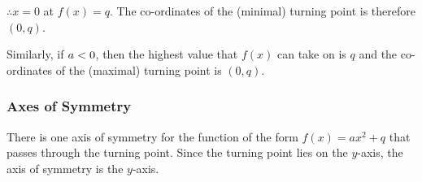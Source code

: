           \label{m39345*id244283}$\therefore $$x=0$ at $f\left(x\right)=q$. The co-ordinates of the (minimal) turning point is therefore $\left(0,q\right)$.\par 
          \label{m39345*id244351}Similarly, if $a<{}0$, then the highest value that $f\left(x\right)$ can take on is $q$ and the co-ordinates of the (maximal) turning point is $\left(0,q\right)$.\par 
        \label{m39345*uid122}
            \subsubsection{ Axes of Symmetry}
            \nopagebreak
          \label{m39345*id244424}There is one axis of symmetry for the function of the form $f\left(x\right)=a{x}^{2}+q$ that passes through the turning point. Since the turning point lies on the $y$-axis, the axis of symmetry is the $y$-axis.\par 
        \label{m39345*uid123}
